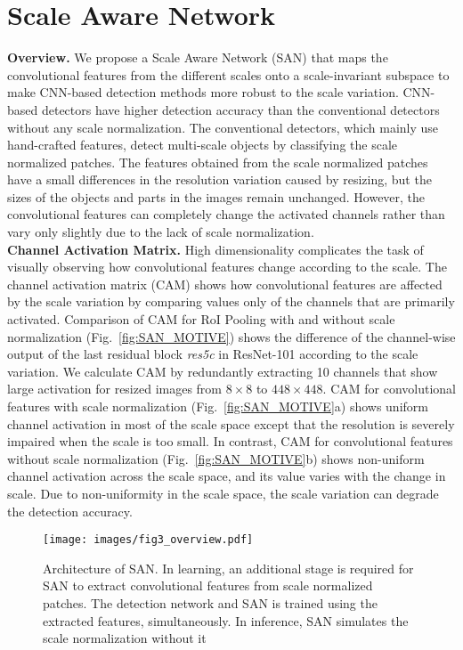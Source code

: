 \documentclass[runningheads]{llncs}
\begin{document}
\section{Scale Aware Network}

\textbf{Overview.}
We propose a Scale Aware Network (SAN) that maps the convolutional features from the different scales onto a scale-invariant subspace to make CNN-based detection methods more robust to the scale variation.
CNN-based detectors have higher detection accuracy than the conventional detectors without any scale normalization.
The conventional detectors, which mainly use hand-crafted features, detect multi-scale objects by classifying the scale normalized patches.
The features obtained from the scale normalized patches have a small differences in the resolution variation caused by resizing, but the sizes of the objects and parts in the images remain unchanged.
However, the convolutional features can completely change the activated channels rather than vary only slightly due to the lack of scale normalization.
\\

\noindent
\textbf{Channel Activation Matrix.}
High dimensionality complicates the task of visually observing how convolutional features change according to the scale.
The channel activation matrix (CAM) shows how convolutional features are affected by the scale variation by comparing values only of the channels that are primarily activated.
Comparison of CAM for RoI Pooling with and without scale normalization (Fig.~\ref{fig:SAN_MOTIVE}) shows the difference of the channel-wise output of the last residual block \textit{res5c} in ResNet-101 according to the scale variation.
We calculate CAM by redundantly extracting 10 channels that show large activation for resized images from $8\times8$ to $448\times448$.
CAM for convolutional features with scale normalization (Fig.~\ref{fig:SAN_MOTIVE}a) shows uniform channel activation in most of the scale space except that the resolution is severely impaired when the scale is too small.
In contrast, CAM for convolutional features without scale normalization (Fig.~\ref{fig:SAN_MOTIVE}b) shows non-uniform channel activation across the scale space, and its value varies with the change in scale.
Due to non-uniformity in the scale space, the scale variation can degrade the detection accuracy.
\\


\begin{figure}[t]
	\texttt{[image: images/fig3\_overview.pdf]}
	\caption{Architecture of SAN.
		In learning, an additional stage is required for SAN to extract convolutional features from scale normalized patches.
		The detection network and SAN is trained using the extracted features, simultaneously.
		In inference, SAN simulates the scale normalization without it
	}
	\centering
	\label{fig:SAN_ARCH}
\end{figure}
\end{document}
